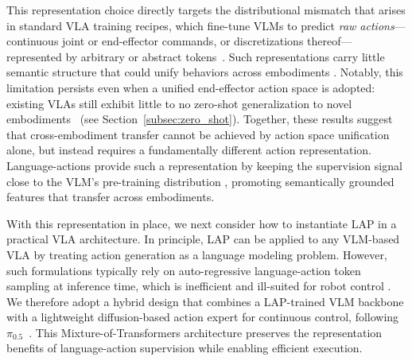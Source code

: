 This representation choice directly targets the distributional mismatch that arises in standard VLA training recipes, which fine-tune VLMs to predict \emph{raw actions}—continuous joint or end-effector commands, or discretizations thereof—represented by arbitrary or abstract tokens~\cite{kim2024openvlaopensourcevisionlanguageactionmodel, pertsch2025fastefficientactiontokenization, lee2025molmoactactionreasoningmodels}. Such representations carry little semantic structure that could unify behaviors across embodiments \cite{zheng2025universalactionsenhancedembodied, ye2025latentactionpretrainingvideos, bu2025univlalearningacttaskcentric, chen2025embodimentequivariantvisionlanguageactionpolicy}. Notably, this limitation persists even when a unified end-effector action space is adopted: existing VLAs still exhibit little to no zero-shot generalization to novel embodiments~\cite{kim2024openvlaopensourcevisionlanguageactionmodel, zheng2025xvlasoftpromptedtransformerscalable} (see Section~\ref{subsec:zero_shot}). Together, these results suggest that cross-embodiment transfer cannot be achieved by action space unification alone, but instead requires a fundamentally different action representation. Language-actions provide such a representation by keeping the supervision signal close to the VLM’s pre-training distribution \cite{hancock2025actionslanguagefinetuningvlms}, promoting semantically grounded features that transfer across embodiments.

With this representation in place, we next consider how to instantiate LAP in a practical VLA architecture. In principle, LAP can be applied to any VLM-based VLA by treating action generation as a language modeling problem. However, such formulations typically rely on auto-regressive language-action token sampling at inference time, which is inefficient and ill-suited for robot control \cite{kim2024openvlaopensourcevisionlanguageactionmodel, pertsch2025fastefficientactiontokenization, driess2025knowledgeinsulatingvisionlanguageactionmodels, hancock2025actionslanguagefinetuningvlms}. We therefore adopt a hybrid design that combines a LAP-trained VLM backbone with a lightweight diffusion-based action expert for continuous control, following $\pi_{0.5}$~\cite{intelligence2025pi05visionlanguageactionmodelopenworld}. This Mixture-of-Transformers architecture \cite{liang2024mixture} preserves the representation benefits of language-action supervision while enabling efficient execution.


